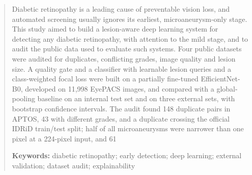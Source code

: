 \begin{abstract}
\noindent Diabetic retinopathy is a leading cause of preventable vision loss, and automated screening usually ignores its earliest, microaneurysm-only stage. This study aimed to build a lesion-aware deep learning system for detecting any diabetic retinopathy, with attention to the mild stage, and to audit the public data used to evaluate such systems. Four public datasets were audited for duplicates, conflicting grades, image quality and lesion size. A quality gate and a classifier with learnable lesion queries and a class-weighted focal loss were built on a partially fine-tuned EfficientNet-B0, developed on 11,998 EyePACS images, and compared with a global-pooling baseline on an internal test set and on three external sets, with bootstrap confidence intervals. The audit found 148 duplicate pairs in APTOS, 43 with different grades, and a duplicate crossing the official IDRiD train/test split; half of all microaneurysms were narrower than one pixel at a 224-pixel input, and 61%

\medskip\noindent\textbf{Keywords:} diabetic retinopathy; early detection; deep learning; external validation; dataset audit; explainability
\end{abstract}
